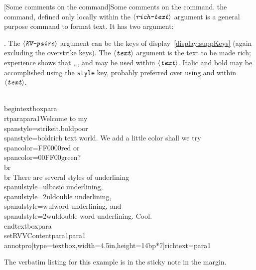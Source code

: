 \documentclass[12pt]{article}
\makeatletter
\let\opt\texttt
\def\ameta#1{$\langle\textit{\texttt{#1}}\rangle$}
\def\darg#1{\texttt{\{#1\}}}
\renewenvironment{quote}[1][]
   {\def\@rgi{#1}\ifx\@rgi\@empty
    \let\rghtm\@empty\else\def\rghtm{\rightmargin\leftmargin}\fi
    \list{}{\rghtm} %
    \item\relax}
   {\endlist}
\renewcommand*{\theparagraph}{\texorpdfstring{\protect\P\protect\ }{\textparagraph}}
\renewcommand{\paragraph}
    {\renewcommand{\@seccntformat}[1]{\theparagraph}%
    \@startsection{paragraph}{4}{0pt}{6pt}{-3pt}{\color{\aeb@subsubsectioncolor}\bfseries}}
\makeatother
\begin{document}
\paragraph[Some comments on the \texorpdfstring{\protect{}}{\textbackslash{span}}
command]{Some comments on the  command.}\label{para:Span}
the  command, defined only locally within the \ameta{rich-text} argument  is a general purpose
command to format text. It has two argument:
\begin{quote}
\cs{span\darg{\ameta{KV-pairs}}\darg{\ameta{text}}}.
\end{quote}
The \ameta{KV-pairs} argument can be the keys of
display~\eqref{display:suppKeys} (again excluding the overstrike keys). The \ameta{text} argument is the
text to be made rich; experience shows that , ,  and  may be used within
\ameta{text}. Italic and bold may be accomplished using the \opt{style} key, probably preferred over
using  and  within \ameta{text}.
\begin{defineJS}{\annotextboxi}
\\begin{textboxpara}
\\rtpara{para1}{Welcome to my \\span{style={strikeit,bold}}{poor}\\span{style=bold}{rich text world}.
We add a little color shall we try \\span{color=FF0000}{red} or \\span{color=00FF00}{green}?\\br\\br
There are several styles of underlining \\span{ulstyle=ul}{basic underlining},
\\span{ulstyle=2ul}{double underlining}, \\span{ulstyle=wul}{word underlining}, and
\\span{ulstyle=2wul}{double word underlining}. Cool.}
\\end{textboxpara}
\\setRVVContent{para1}{para1}
\\annotpro[type=textbox,width=4.5in,height=14bp*7]{richtext=para1}
\end{defineJS}
\begin{quote}
\begin{textboxpara}
\end{textboxpara}
%
\annotpro[margin,readonly,margintext={\centering The Code}]{\annotextboxi}%
\end{quote}
The verbatim listing for this example is in the sticky note in the margin.
\end{document}
